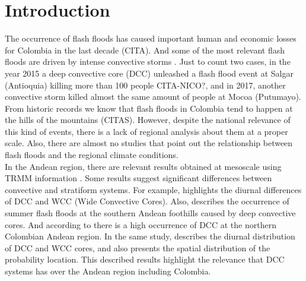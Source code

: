 \documentclass[preprint,12pt]{elsarticle}
\begin{document}
\linenumbers

\section{Introduction}
\label{intro}

The occurrence of flash floods has caused important human and economic losses for Colombia in the last decade (CITA). And some of the most relevant flash floods are driven by intense convective storms \citep{Maddox1978,Roy2008,Braud2014,Llasat2016}. Just to count two cases, in the year 2015 a deep convective core (DCC) unleashed a flash flood event at Salgar (Antioquia) killing more than 100 people CITA-NICO?, and in 2017, another convective storm killed almost the same amount of people at Mocoa (Putumayo). From historic records we know that flash floods in Colombia tend to happen at the hills of the mountains (CITAS). However, despite the national relevance of this kind of events, there is a lack of regional analysis about them at a proper scale. Also, there are almost no studies that point out the relationship between flash floods and the regional climate conditions.\\

In the Andean region, there are relevant results obtained at mesoscale using TRMM information \citep{Romatschke2010,Romatschke2011a,Mohr2014a,Rasmussen2016c}. Some results suggest significant differences between convective and stratiform systems. For example, \citet{Romatschke2010} highlights the diurnal differences of DCC and WCC (Wide Convective Cores). Also, \citet{Rasmussen2014} describes the occurrence of summer flash floods at the southern Andean foothills caused by deep convective cores. And according to \cite{Zuluaga2015} there is a high occurrence of DCC at the northern Colombian Andean region. In the same study, \citet{Zuluaga2015} describes the diurnal distribution of DCC and WCC cores, and also presents the spatial distribution of the probability location. This described results highlight the relevance that DCC systems has over the Andean region including Colombia.\\

\end{document}
